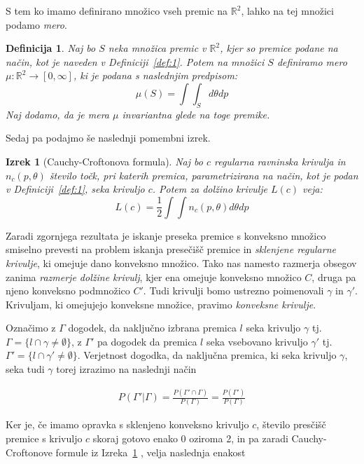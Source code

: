 \documentclass[a4paper]{article}
\newtheorem{definicija}{Definicija}
\newtheorem{izrek}{Izrek}
\begin{document}
S tem ko imamo definirano množico vseh premic na $\mathbb{R}^2$, lahko na tej množici podamo \textit{mero}.

\begin{definicija}
Naj bo $S$ neka množica premic v $\mathbb{R}^2$, kjer so premice podane na način, kot je naveden v Definiciji~\ref{def:1}. Potem na množici $S$ definiramo mero $\mu : \mathbb{R}^2 \rightarrow [0, \infty ]$, ki je podana s naslednjim predpisom: $$ \mu(S) =  \int \int_S  d\theta dp$$Naj dodamo, da je mera $\mu$ invariantna glede na toge premike. 
\end{definicija}

Sedaj pa podajmo še naslednji pomembni izrek.

\begin{izrek}[Cauchy-Croftonova formula]\label{izrek:1}
 Naj bo $c$ regularna ravninska krivulja in $n_c (p, \theta)$  število točk, pri katerih premica, parametrizirana na način, kot je podan v Definiciji~\ref{def:1}, seka krivuljo $c$. Potem za dolžino krivulje $L(c)$ veja: $$L(c) = \frac{1}{2}\int \int n_c (p, \theta) d\theta dp $$ 
 \end{izrek}

\vspace{3 mm}

Zaradi zgornjega rezultata je iskanje preseka premice s konveksno množico smiselno prevesti na problem iskanja presečišč premice in \textit{sklenjene regularne krivulje}, ki omejuje dano konveksno množico. Tako nas namesto razmerja obsegov zanima \textit{razmerje dolžine krivulj}, kjer ena omejuje konveksno množico $C$, druga pa njeno konveksno podmnožico $C'$. Tudi krivulji bomo ustrezno poimenovali $\gamma$ in $\gamma '$. Krivuljam, ki omejujejo konveksne množice, pravimo \textit{konveksne krivulje}. 

Označimo z $\Gamma$ dogodek, da naključno izbrana premica $l$ seka krivuljo $\gamma$ tj. $\Gamma = \{l \cap \gamma \ne  \emptyset \}$, z $\Gamma'$ pa dogodek da premica $l$ seka vsebovano krivuljo $\gamma'$  tj. $\Gamma' = \{l \cap \gamma' \ne  \emptyset \}$.  Verjetnost dogodka, da naključna premica, ki seka krivuljo $\gamma$, seka tudi $\gamma$ torej izrazimo na naslednji način

\begin{align}
P(\Gamma' | \Gamma) = \frac{P( \Gamma' \cap  \Gamma)}{P( \Gamma)} = \frac{P( \Gamma')}{P( \Gamma)} \label{eq1}
\end{align}

Ker je, če imamo opravka s sklenjeno konveksno krivuljo $c$, število presčišč premice s krivuljo $c$ skoraj gotovo enako 0 oziroma 2, in pa zaradi Cauchy-Croftonove formule iz Izreka~\ref{izrek:1} , velja naslednja enakost
\end{document}
